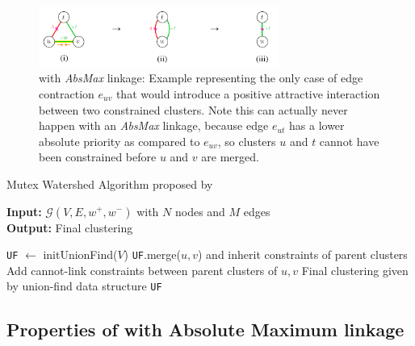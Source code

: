 \begin{figure}[t]
        \centering
        \includegraphics[width=0.7\textwidth]{./figs/proof_abs_max_example.pdf} %
\caption{\algname{} with \emph{AbsMax} linkage: Example representing the only case of edge contraction $e_{uv}$ that would introduce a positive attractive interaction between two constrained clusters. Note this can actually never happen with an \emph{AbsMax} linkage, because edge $e_{ut}$ has a lower absolute priority as compared to $e_{uv}$, so clusters $u$ and $t$ cannot have been constrained before $u$ and $v$ are merged.
}
\label{fig:abs_max_proof_example}  
\end{figure}
\begin{algorithm*}[t]
  \caption{Mutex Watershed Algorithm proposed by \cite{wolf2018mutex}}
\hspace*{\algorithmicindent} \textbf{Input:} $\mathcal{G}(V,E,w^+,w^-)$ with $N$ nodes and $M$ edges \\
\hspace*{\algorithmicindent} \textbf{Output:} Final clustering \\
  \hspace*{\algorithmicindent} 
  \begin{algorithmic}[1]
      \State \texttt{UF} $\gets$ initUnionFind($V$) 
         
            
            \State \texttt{UF}.merge($u,v$) and inherit constraints of parent clusters
            \State Add cannot-link constraints between parent clusters of $u,v$
          \EndIf
        \EndIf
      \EndFor
      \State
      \Return Final clustering given by union-find data structure \texttt{UF}
  \end{algorithmic}
  \label{alg:mutex_watershed}
\end{algorithm*}





\subsection{Properties of \algname{} with Absolute Maximum linkage}\label{sec:appendix_abs_max}

